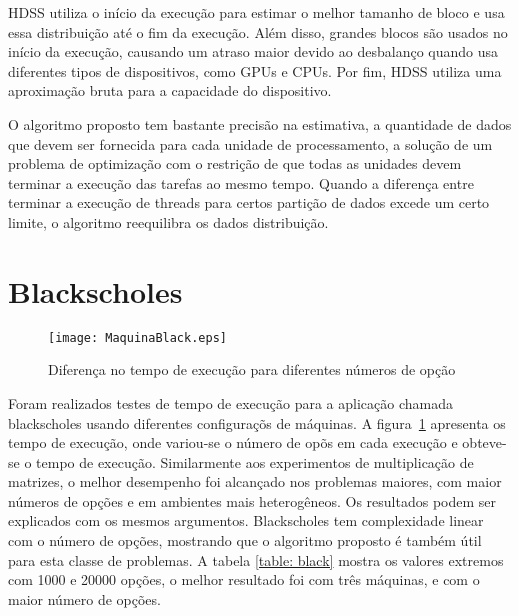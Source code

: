 HDSS utiliza o início da execução para estimar o melhor tamanho de bloco e usa essa distribuição até o fim da execução. Além disso, grandes blocos são usados no início da execução, 
causando um atraso maior devido ao desbalanço quando usa diferentes tipos de dispositivos, 
como GPUs e CPUs. Por fim, HDSS utiliza uma aproximação bruta para a capacidade do dispositivo.

O algoritmo proposto tem  bastante precisão na estimativa,  a quantidade de dados que devem ser 
fornecida para cada unidade de processamento, a solução de um problema de optimização com o 
restrição de que todas as unidades devem terminar a execução das tarefas ao mesmo 
tempo. Quando a diferença entre terminar a execução de threads para certos 
partição de dados excede um certo limite, o algoritmo reequilibra os dados 
distribuição.

\section{Blackscholes}

\begin{figure}[htb]
	\begin{center}
	\centering
			\texttt{[image: MaquinaBlack.eps]}
	\caption{Diferença no tempo de execução para diferentes números de opção}
	\label{fig:black}
	\end{center}
\end{figure}

Foram realizados testes de tempo de execução para a aplicação chamada blackscholes usando diferentes configuraçõs de máquinas. A figura~\ref{fig:black} apresenta os tempo de execução, onde variou-se o número de opõs em cada execução e obteve-se o tempo de execução. Similarmente aos experimentos de multiplicação de matrizes, o melhor desempenho foi alcançado nos problemas maiores, com maior números de opções e em ambientes mais heterogêneos. Os resultados podem ser explicados com os mesmos argumentos. Blackscholes tem complexidade linear com o número de opções, mostrando que o algoritmo proposto é também útil para esta classe de problemas. A tabela  \ref{table: black} mostra os valores extremos com 1000 e 20000 opções, o melhor resultado foi com três máquinas, e com o maior número de opções.

